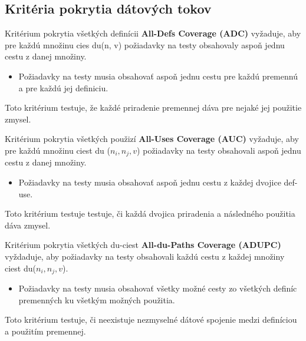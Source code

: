 \subsection*{Kritéria pokrytia dátových tokov}
\begin{description}
	\item Kritérium pokrytia všetkých definícii \textbf{All-Defs Coverage (ADC)} vyžaduje, aby pre každú množinu cies du(n, v) požiadavky na testy obsahovaly aspoň jednu cestu z danej množiny.
		\begin{itemize}
			\item Požiadavky na testy musia obsahovať aspoň jednu cestu pre každú premennú a pre každú jej definiciu.
		\end{itemize}
		Toto kritérium testuje, že každé priradenie premennej dáva pre nejaké jej použitie zmysel.

	\item Kritérium pokrytia všetkých použizí \textbf{All-Uses Coverage (AUC)} vyžaduje, aby pre každú množinu ciest du ($n_i, n_j, v$) požiadavky na testy obsahovali aspoň jednu cestu z danej množiny.
		\begin{itemize}
			\item Požiadavky na testy musia obsahovať aspoň jednu cestu z každej dvojice def-use.
		\end{itemize}
		Toto kritérium testuje testuje, či každá dvojica priradenia a následného použitia dáva zmysel.

	\item Kritérium pokrytia všetkých du-ciest \textbf{All-du-Paths Coverage (ADUPC)} vyždaduje, aby požiadavky na testy obsahovali každú cestu z každej množiny ciest du($n_i, n_j, v$).
		\begin{itemize}
			\item Požiadavky na testy musia obsahovať všetky možné cesty zo všetkých definíc premenných ku všetkým možných použitia.
		\end{itemize}
		Toto kritérium testuje, či neexistuje nezmyselné dátové spojenie medzi definíciou a použitím premennej.
\end{description}

